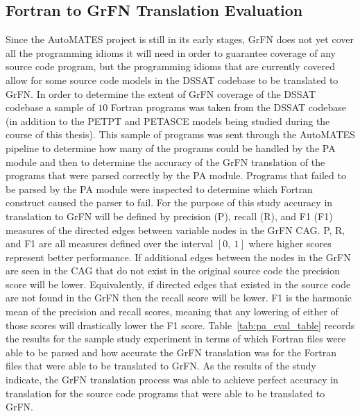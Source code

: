 \subsection{Fortran to GrFN Translation Evaluation\label{sec:translation_eval}}
Since the AutoMATES project is still in its early stages, GrFN does not yet cover all the programming idioms it will need in order to guarantee coverage of any source code program, but the programming idioms that are currently covered allow for some source code models in the DSSAT codebase to be translated to GrFN.
In order to determine the extent of GrFN coverage of the DSSAT codebase a sample of $10$ Fortran programs was taken from the DSSAT codebase (in addition to the PETPT and PETASCE models being studied during the course of this thesis).
This sample of programs was sent through the AutoMATES pipeline to determine how many of the programs could be handled by the PA module and then to determine the accuracy of the GrFN translation of the programs that were parsed correctly by the PA module.
Programs that failed to be parsed by the PA module were inspected to determine which Fortran construct caused the parser to fail.
For the purpose of this study accuracy in translation to GrFN will be defined by precision (P), recall (R), and F1 (F1) measures of the directed edges between variable nodes in the GrFN CAG.
P, R, and F1 are all measures defined over the interval $[0,~1]$ where higher scores represent better performance.
If additional edges between the nodes in the GrFN are seen in the CAG that do not exist in the original source code the precision score will be lower.
Equivalently, if directed edges that existed in the source code are not found in the GrFN then the recall score will be lower.
F1 is the harmonic mean of the precision and recall scores, meaning that any lowering of either of those scores will drastically lower the F1 score.
Table~\ref{tab:pa_eval_table} records the results for the sample study experiment in terms of which Fortran files were able to be parsed and how accurate the GrFN translation was for the Fortran files that were able to be translated to GrFN.
As the results of the study indicate, the GrFN translation process was able to achieve perfect accuracy in translation for the source code programs that were able to be translated to GrFN.

